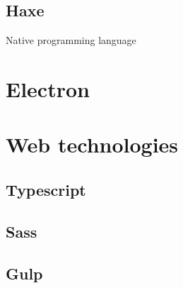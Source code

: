 \subsection{Haxe}

Native programming language

\section{Electron}

\section{Web technologies}

\subsection{Typescript}

\subsection{Sass}

\subsection{Gulp}

